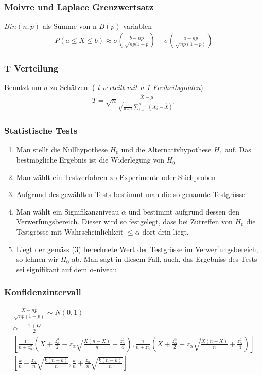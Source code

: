 \documentclass[landscape,twocolumn,a4paper]{article}
\begin{document}
\subsubsection*{Moivre und Laplace Grenzwertsatz}
$Bin(n,p)$ als Summe von n $B(p)$ variablen
\begin{align*}
 P(a \le X \le b) \approx \sigma(\frac{b-np}{\sqrt{np(1-p}}) - \sigma(\frac{a-np}{\sqrt{np(1-p)}})
\end{align*}

\subsubsection*{T Verteilung}
Benutzt um $\sigma$ zu Schätzen: (\textit{ t verteilt mit n-1 Freiheitsgraden})
\begin{align*}
 T = \sqrt{n} \frac{\overline{X}-\mu}{\sqrt{\frac{1}{n-1} \sum_{i=1}^{n} (X_i-\overline{X})^2}}
\end{align*}

\subsubsection*{Statistische Tests}
\begin{enumerate}
	\item Man stellt die Nullhypothese $H_0$ und die Alternativhypothese $H_1$ auf. Das bestmögliche Ergebnis ist die Widerlegung von $H_0$
	\item Man wählt ein Testverfahren zb Experimente oder Stichproben
	\item Aufgrund des gewählten Tests bestimmt man die so genannte Testgrösse
	\item Man wählt ein Signifikanzniveau $\alpha$ und bestimmt aufgrund dessen den Verwerfungsbereich. Dieser wird so festgelegt, dass bei Zutreffen von $H_0$ die Testgrösse mit Wahrscheinlichkeit $\leq \alpha$ dort drin liegt. 
	\item Liegt der gemäss (3) berechnete Wert der Testgrösse im Verwerfungsbereich, so lehnen wir $H_0$ ab. Man sagt in diesem Fall, auch, das Ergebniss des Tests sei signifikant auf dem $\alpha$-niveau
\end{enumerate}
\subsubsection*{Konfidenzintervall}
\begin{align*}
	\frac{X-np}{\sqrt{np(1-p)}} \sim N(0,1) \\
	\alpha=\frac{1+Q}{2} \\
\left[\frac{1}{n+z_\alpha^2} \left(X+\frac{z_\alpha^2}{2}-z_\alpha\sqrt{\frac{X(n-X)}{n}+\frac{z_\alpha^2}{4}}\right), \frac{1}{n+z_\alpha^2} \left(X+\frac{z_\alpha^2}{2}+z_\alpha\sqrt{\frac{X(n-X)}{n}+\frac{z_\alpha^2}{4}}\right)\right] \\
	\left[\frac{k}{n}-\frac{z_\alpha}{n}\sqrt{\frac{k(n-k)}{n}}, \frac{k}{n}+\frac{z_\alpha}{n}\sqrt{\frac{k(n-k)}{n}} \right]
\end{align*}
\end{document}
